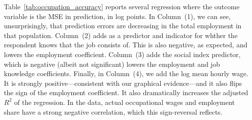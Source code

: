 Table~\ref{tab:occupation_accuracy} reports several regression where the outcome variable is the MSE in prediction, in log points. 
In Column~(1), we can see, unsurprisingly, that prediction errors are decreasing in the total employment in that population. 
Column~(2) adds as a predictor and indicator for whther the respondent knows that the job consists of. 
This is also negative, as expected, and lowers the employment coefficient.  
Column~(3) adds the social index predictor, which is negative (albeit not significant) lowers the employment and job knowledge coefficients. 
Finally, in Column~(4), we add the log mean hourly wage. 
It is strongly positive---consistent with our graphical evidence---and it also flips the sign of the employment coefficient.  
It also dramatically increases the adjusted $R^2$ of the regression. 
In the data, actual occupational wages and employment share have a strong negative correlation, which this sign-reversal reflects. 







